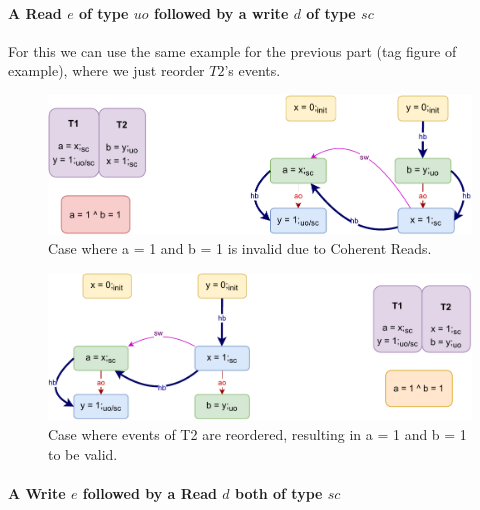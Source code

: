     \paragraph{A Read $e$ of type $uo$ followed by a write $d$ of type $sc$}

        For this we can use the same example for the previous part (tag figure of example), where we just reorder $T2$'s events.
        \begin{figure}[H]
            \centering
            \includegraphics[scale=0.7]{5.InstructionReordering/4.ValidReorderingCandidate/Example4(Ruo-Wsc).pdf}
            \caption{Case where a = 1 and b = 1 is invalid due to Coherent Reads.}
        \end{figure}

        \begin{figure}[H]
            \centering
            \includegraphics[scale=0.7]{5.InstructionReordering/4.ValidReorderingCandidate/Example4R(Ruo-Wsc).pdf}
            \caption{Case where events of T2 are reordered, resulting in  a = 1 and b = 1 to be valid.}
        \end{figure}

        
    \paragraph{A Write $e$ followed by a Read $d$ both of type $sc$}
        
